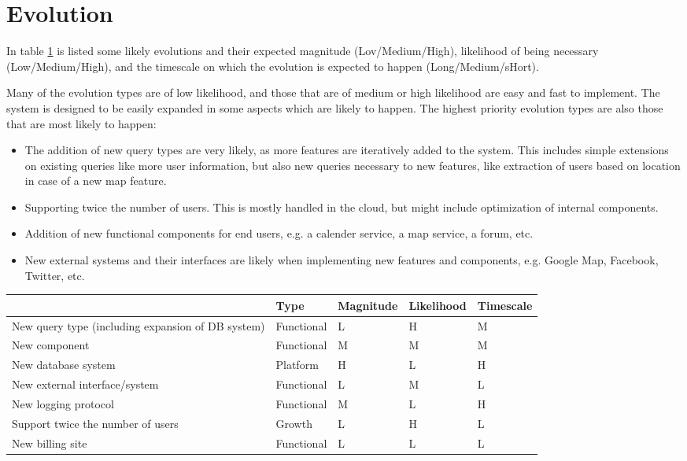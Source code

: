 \section{Evolution}
\label{sec:evolution}
In table \ref{tab:evolution} is listed some likely evolutions and their
expected magnitude (Lov/Medium/High), likelihood of being necessary
(Low/Medium/High), and the timescale on which the evolution is expected to
happen (Long/Medium/sHort).

Many of the evolution types are of low likelihood, and those that are of medium
or high likelihood are easy and fast to implement. The system is designed to be
easily expanded in some aspects which are likely to happen. The highest
priority evolution types are also those that are most likely to happen:

\begin{itemize}
\item The addition of new query types are very likely, as more features are
iteratively added to the system. This includes simple extensions on existing
queries like more user information, but also new queries necessary to new
features, like extraction of users based on location in case of a new map
feature.  
\item Supporting twice the number of users. This is mostly handled in the
    cloud, but might include optimization of internal components.
\item Addition of new functional components for end users, e.g. a calender
service, a map service, a forum, etc.  \item New external systems and their
    interfaces are likely when implementing new features and components, e.g.
    Google Map, Facebook, Twitter, etc. 
\end{itemize}

\begin{table}[ht]
    \centering
    \begin{tabular}{| p{5cm} | l | l | l | l |}
            & Type & Magnitude & Likelihood & Timescale \\ \hline \hline
        New query type (including expansion of DB system) & Functional & L & H
            & M \\ \hline New component & Functional & M & M & M \\ \hline
        New database system & Platform & H & L & H \\ \hline
        New external interface/system & Functional & L & M & L \\ \hline
        New logging protocol & Functional & M & L & H \\ \hline
        Support twice the number of users & Growth & L & H & L \\ \hline
        New billing site & Functional & L & L & L \\ \hline
    \end{tabular}
    \label{tab:evolution}
\end{table}


